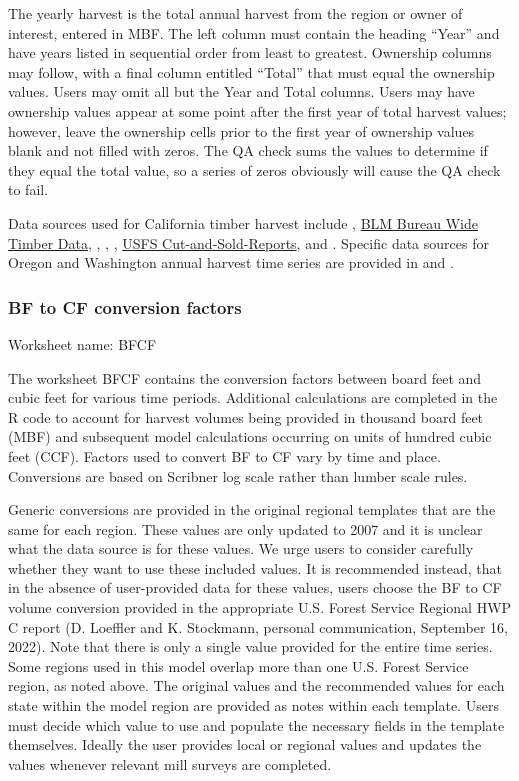 \documentclass[
  openany]{book}
\begin{document}
The yearly harvest is the total annual harvest from the region or owner of interest, entered in MBF. The left column must contain the heading ``Year'' and have years listed in sequential order from least to greatest. Ownership columns may follow, with a final column entitled ``Total'' that must equal the ownership values. Users may omit all but the Year and Total columns. Users may have ownership values appear at some point after the first year of total harvest values; however, leave the ownership cells prior to the first year of ownership values blank and not filled with zeros. The QA check sums the values to determine if they equal the total value, so a series of zeros obviously will cause the QA check to fail.

Data sources used for California timber harvest include \textcite{bolsinger1976}, \href{https://www.blm.gov/programs/natural-resources/forests-and-woodlands/timber-sales/bureau-wide-timber-data}{BLM Bureau Wide Timber Data}, \textcite{morgan2004}, \textcite{morgan2012}, \textcite{mciver2015}, \href{https://www.fs.fed.us/forestmanagement/products/cut-sold/index.shtml}{USFS Cut-and-Sold-Reports}, and \textcite{warren2005}. Specific data sources for Oregon and Washington annual harvest time series are provided in \textcite{morgan2021} and \textcite{nichols2020}.

\hypertarget{own-prov-input-bfcf}{%
\subsubsection{BF to CF conversion factors}\label{own-prov-input-bfcf}}

Worksheet name: BFCF

The worksheet BFCF contains the conversion factors between board feet and cubic feet for various time periods. Additional calculations are completed in the R code to account for harvest volumes being provided in thousand board feet (MBF) and subsequent model calculations occurring on units of hundred cubic feet (CCF). Factors used to convert BF to CF vary by time and place. Conversions are based on Scribner log scale rather than lumber scale rules.

Generic conversions are provided in the original regional templates that are the same for each region. These values are only updated to 2007 and it is unclear what the data source is for these values. We urge users to consider carefully whether they want to use these included values. It is recommended instead, that in the absence of user-provided data for these values, users choose the BF to CF volume conversion provided in the appropriate U.S. Forest Service Regional HWP C report (D. Loeffler and K. Stockmann, personal communication, September 16, 2022). Note that there is only a single value provided for the entire time series. Some regions used in this model overlap more than one U.S. Forest Service region, as noted above. The original values and the recommended values for each state within the model region are provided as notes within each template. Users must decide which value to use and populate the necessary fields in the template themselves. Ideally the user provides local or regional values and updates the values whenever relevant mill surveys are completed.
\end{document}

